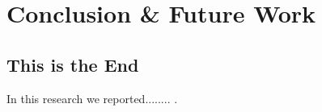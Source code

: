 \documentclass[12pt,a4paper,oneside]{book}
\begin{document}
	






\chapter{Conclusion \& Future Work}\label{ch:Conclusions}


\section{This is the End}
\label{sec:This_is_the_end}
%
In this research we reported........ .


\end{document}
